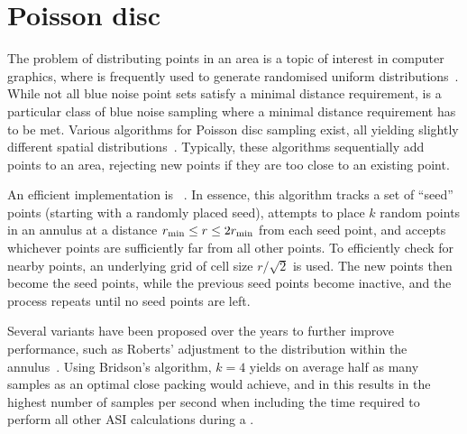 \section{Poisson disc}
The problem of distributing points in an area is a topic of interest in computer graphics, where  is frequently used to generate randomised uniform distributions~\cite{BlueNoiseSurvey}. %
While not all blue noise point sets satisfy a minimal distance requirement,  is a particular class of blue noise sampling where a minimal distance requirement has to be met.
Various algorithms for Poisson disc sampling exist, all yielding slightly different spatial distributions~\cite{EfficientBlueNoisePointSets,PoissonDiskComparison,SamplingPolyominoes}.
Typically, these algorithms sequentially add points to an area, rejecting new points if they are too close to an existing point. \par
An efficient implementation is ~\cite{FastPoissonDiskSampling}.
In essence, this algorithm tracks a set of ``seed'' points (starting with a randomly placed seed), attempts to place $k$ random points in an annulus at a distance $r_\mathrm{min} \leq r \leq 2 r_\mathrm{min}$ from each seed point, and accepts whichever points are sufficiently far from all other points.
To efficiently check for nearby points, an underlying grid of cell size $r/\sqrt{2}$ is used.
The new points then become the seed points, while the previous seed points become inactive, and the process repeats until no seed points are left. \par
Several variants have been proposed over the years to further improve performance, such as Roberts' adjustment to the distribution within the annulus~\cite{PoissonRoberts}.
Using Bridson's algorithm, $k=4$ yields on average half as many samples as an optimal close packing would achieve, and in \hotspice this results in the highest number of samples per second when including the time required to perform all other ASI calculations during a . \\\par

